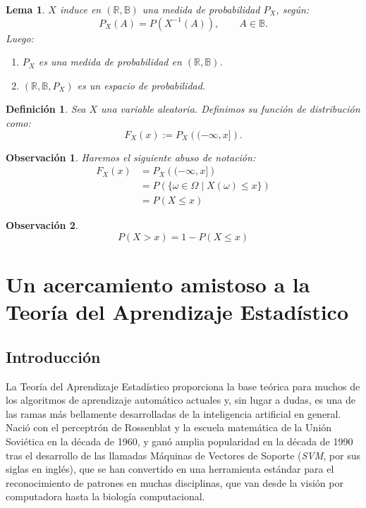 \documentclass{report}
\newtheorem{lem}{Lema}[subsection]
\newtheorem{dfn}{Definición}[subsection]
\newtheorem{obs}{Observación}[subsection]
\begin{document}
\begin{lem} $X$ induce en $(\mathbb{R}, \mathbb{B})$ una medida de probabilidad $P_X$, según:
    $$
    P_X(A) = P(X^{-1}(A)), \qquad A\in\mathbb{B}.
    $$
    Luego:
    \begin{enumerate}
        \item $P_X$ es una medida de probabilidad en $(\mathbb{R}, \mathbb{B})$.
        \item $(\mathbb{R}, \mathbb{B}, P_X)$ es un espacio de probabilidad.
    \end{enumerate}
\end{lem}

\begin{dfn}
Sea $X$ una variable aleatoria. Definimos su \emph{función de distribución} como:
$$
    F_X(x) := P_X\left( (-\infty, x] \right).
$$
\end{dfn}

\begin{obs} Haremos el siguiente abuso de notación:
    \begin{equation*}
        \begin{split}
            F_X(x) &= P_X\left( (-\infty, x] \right)\\
            & = P\left( \{\omega \in \Omega \;|\; X(\omega) \leq x\} \right)\\
            & = P(X\leq x)
        \end{split}
    \end{equation*}
\end{obs}

\begin{obs} 
\begin{equation*}
    P(X>x) = 1 - P(X\leq x)
\end{equation*}
\end{obs}

\chapter{Un acercamiento amistoso a la Teoría del Aprendizaje Estadístico}
\section{Introducción}
La Teoría del Aprendizaje Estadístico proporciona la base teórica para muchos de los algoritmos de aprendizaje automático actuales y,
sin lugar a dudas, es una de las ramas más bellamente desarrolladas de la inteligencia artificial en general. Nació con el perceptrón de Rossenblat
y la escuela matemática de la Unión Soviética en la década de 1960, y ganó amplia popularidad en la década de 1990 tras el desarrollo de las llamadas 
Máquinas de Vectores de Soporte (\textit{SVM}, por sus siglas en inglés), que se han convertido en una herramienta estándar para el reconocimiento de 
patrones en muchas disciplinas, que van desde la visión por computadora hasta la biología computacional.\newline
\end{document}
